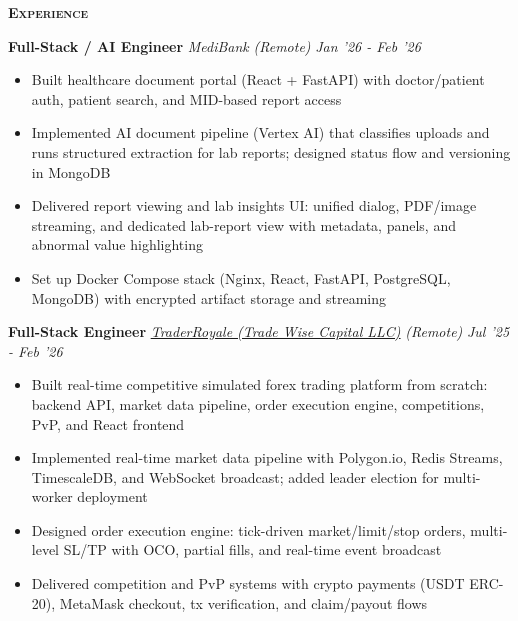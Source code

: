 \documentclass[10pt]{article}
\newcommand{\headerwidth}{7.45in}
\newenvironment{changemargin}[2]{%
  \begin{list}{}{%
    \setlength{\topsep}{0pt}%
    \setlength{\leftmargin}{#1}%
    \setlength{\rightmargin}{#2}%
    \setlength{\listparindent}{\parindent}%
    \setlength{\itemindent}{\parindent}%
    \setlength{\parsep}{\parskip}%
  }%
  \item[]}{\end{list}
}
\newcommand{\header}[1]{
	\begin{changemargin}{-0.75in}{-0.75in}
    \begin{tcolorbox}[colframe=mycolor,boxrule=0.0pt,arc=0pt,
      left=6pt,right=6pt,top=6pt,bottom=6pt,boxsep=0pt,width=\headerwidth]
		\scshape{\textbf{#1}}
\end{tcolorbox}
	\end{changemargin}
}
\newenvironment{body} {
	\vspace*{-16pt}
	\begin{changemargin}{-0.6in}{-0.65in}
  }
	{\end{changemargin}
}
\begin{document}
\smallskip
\header{Experience}
\begin{body}
	\vspace{10pt}
    \textbf{Full-Stack / AI Engineer} \emph{MediBank} \emph{(Remote)} \hfill \emph{Jan '26 - Feb '26}
    \begin{itemize}
        \item Built healthcare document portal (React + FastAPI) with doctor/patient auth, patient search, and MID-based report access
        \item Implemented AI document pipeline (Vertex AI) that classifies uploads and runs structured extraction for lab reports; designed status flow and versioning in MongoDB
        \item Delivered report viewing and lab insights UI: unified dialog, PDF/image streaming, and dedicated lab-report view with metadata, panels, and abnormal value highlighting
        \item Set up Docker Compose stack (Nginx, React, FastAPI, PostgreSQL, MongoDB) with encrypted artifact storage and streaming
    \end{itemize}
    \smallskip{}

    \textbf{Full-Stack Engineer} \href{https://royale.tradewise.tech}{\emph{TraderRoyale (Trade Wise Capital LLC)}} \emph{(Remote)} \hfill \emph{Jul '25 - Feb '26}
    \begin{itemize}
        \item Built real-time competitive simulated forex trading platform from scratch: backend API, market data pipeline, order execution engine, competitions, PvP, and React frontend
        \item Implemented real-time market data pipeline with Polygon.io, Redis Streams, TimescaleDB, and WebSocket broadcast; added leader election for multi-worker deployment
        \item Designed order execution engine: tick-driven market/limit/stop orders, multi-level SL/TP with OCO, partial fills, and real-time event broadcast
        \item Delivered competition and PvP systems with crypto payments (USDT ERC-20), MetaMask checkout, tx verification, and claim/payout flows
    \end{itemize}
    \smallskip{}


\end{body}
\end{document}
